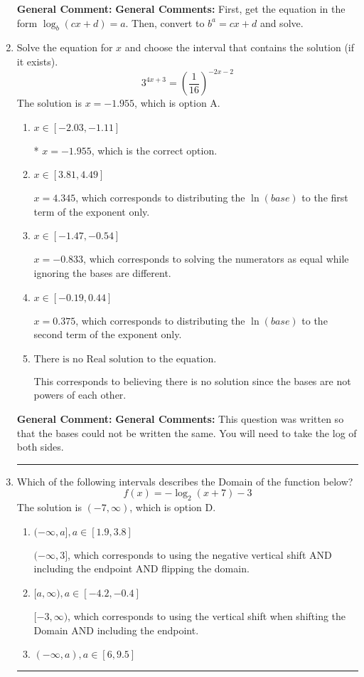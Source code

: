 \documentclass{extbook}[14pt]
\newcommand{\litem}[1]{\item #1

\rule{\textwidth}{0.4pt}}
\begin{document}
\begin{enumerate}
{\textbf{General Comment:} \textbf{General Comments:} First, get the equation in the form $\log_b{(cx+d)} = a$. Then, convert to $b^a = cx+d$ and solve.
}
\litem{
Solve the equation for $x$ and choose the interval that contains the solution (if it exists).
\[ 3^{4x+3} = \left(\frac{1}{16}\right)^{-2x-2} \]The solution is \( x = -1.955 \), which is option A.\begin{enumerate}[label=\Alph*.]
\item \( x \in [-2.03, -1.11] \)

* $x = -1.955$, which is the correct option.
\item \( x \in [3.81, 4.49] \)

$x = 4.345$, which corresponds to distributing the $\ln(base)$ to the first term of the exponent only.
\item \( x \in [-1.47, -0.54] \)

$x = -0.833$, which corresponds to solving the numerators as equal while ignoring the bases are different.
\item \( x \in [-0.19, 0.44] \)

$x = 0.375$, which corresponds to distributing the $\ln(base)$ to the second term of the exponent only.
\item \( \text{There is no Real solution to the equation.} \)

This corresponds to believing there is no solution since the bases are not powers of each other.
\end{enumerate}

\textbf{General Comment:} \textbf{General Comments:} This question was written so that the bases could not be written the same. You will need to take the log of both sides.
}
\litem{
Which of the following intervals describes the Domain of the function below?
\[ f(x) = -\log_2{(x+7)}-3 \]The solution is \( (-7, \infty) \), which is option D.\begin{enumerate}[label=\Alph*.]
\item \( (-\infty, a], a \in [1.9, 3.8] \)

$(-\infty, 3]$, which corresponds to using the negative vertical shift AND including the endpoint AND flipping the domain.
\item \( [a, \infty), a \in [-4.2, -0.4] \)

$[-3, \infty)$, which corresponds to using the vertical shift when shifting the Domain AND including the endpoint.
\item \( (-\infty, a), a \in [6, 9.5] \)


\end{enumerate}}
\end{enumerate}
\end{document}
